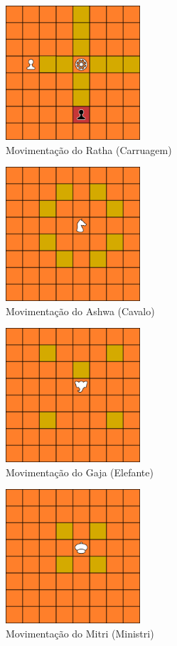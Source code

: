 \documentclass{article}
\begin{document}
    \begin{figure}[h]
    \centering
    \includegraphics[width=5cm]{imgs/ratha_moves.png}
    \caption{Movimentação do Ratha (Carruagem)}
    \label{figura:ratha_moves}
    \end{figure}

    \begin{figure}[h]
    \centering
    \includegraphics[width=5cm]{imgs/ashwa_moves.png}
    \caption{Movimentação do Ashwa (Cavalo)}
    \label{figura:ashwa_moves}
    \end{figure}
    
    \begin{figure}[h]
    \centering
    \includegraphics[width=5cm]{imgs/gaja_moves.png}
    \caption{Movimentação do Gaja (Elefante)}
    \label{figura:gaja_moves}
    \end{figure}
    
    \begin{figure}[h]
    \centering
    \includegraphics[width=5cm]{imgs/mitri_moves.png}
    \caption{Movimentação do Mitri (Ministri)}
    \label{figura:mitri_moves}
    \end{figure}
\end{document}
